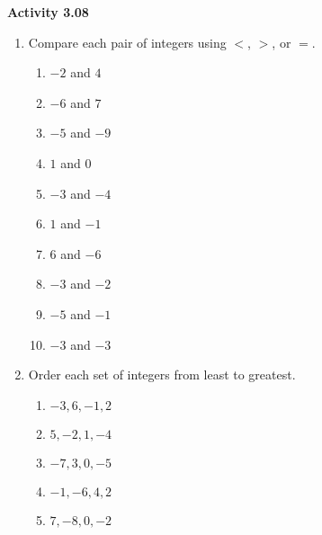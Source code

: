 \vspace{0.3ex}
\noindent\textbf{Activity 3.08}

\vspace{0.2ex}

\begin{enumerate}[noitemsep, label = \color{blue}\Alph*. ]
    \item Compare each pair of integers using \(<\), \(>\), or \(=\).
\begin{multicols}{2}
      \begin{enumerate}[noitemsep, label = \color{blue}\arabic*. ]
            \item \( -2 \) and \( 4 \)
            \item \( -6 \) and \( 7 \)
            \item \( -5 \) and \( -9 \)
            \item \( 1 \) and \( 0 \)
            \item \( -3 \) and \( -4 \)
            \item \( 1 \) and \( -1 \)
            \item \( 6 \) and \( -6 \)
            \item \( -3 \) and \( -2 \)
            \item \( -5 \) and \( -1 \)
            \item \( -3 \) and \( -3 \)
        \end{enumerate}
    \end{multicols}

    \item Order each set of integers from least to greatest.
\begin{multicols}{2}
      \begin{enumerate}[noitemsep, label = \color{blue}\arabic*. ]
            \item \( -3, 6, -1, 2 \)
            \item \( 5, -2, 1, -4 \)
            \item \( -7, 3, 0, -5 \)
            \item \( -1, -6, 4, 2 \)
            \item \( 7, -8, 0, -2 \)
        \end{enumerate}
    \end{multicols}
\end{enumerate}

